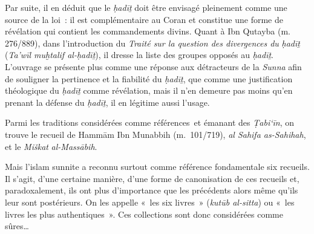 Par suite, il en déduit que le \emph{ḥadīṯ} doit être envisagé
pleinement comme une source de la loi~: il est complémentaire au Coran
et constitue une forme de révélation qui contient les commandements
divins. Quant à Ibn Qutayba (m. 276/889), dans l'introduction du
\emph{Traité sur la question des divergences du} \emph{ḥadīṯ}
(\emph{Ta'wīl muḫtalif al-ḥadīṯ}), il dresse la liste des groupes opposés au \emph{ḥadīṯ}.
L'ouvrage se présente plus comme une réponse aux détracteurs de la
\emph{Sunna} afin de souligner la pertinence et la fiabilité du
\emph{ḥadīṯ}, que comme une justification théologique du \emph{ḥadīṯ}
comme révélation, mais il n'en demeure pas moins qu'en prenant la
défense du \emph{ḥadīṯ}, il en légitime aussi l'usage.


Parmi les traditions considérées comme références~et émanant des
\emph{Ṭabi`īn}, on trouve le recueil de Hammām Ibn Munabbih
(m.~101/719),
\emph{al Sahifa as-Sahihah}, et le \emph{Miškat} \emph{al-Massābih}.

Mais l'islam sunnite a reconnu surtout comme référence fondamentale six
recueils. Il s'agit, d'une certaine manière, d'une forme de canonisation
de ces recueils et, paradoxalement, ils ont plus d'importance que les
précédents alors même qu'ils leur sont postérieurs. On les appelle «~les
six livres~» (\emph{kutūb al-sitta}) ou «~les livres les plus
authentiques~». Ces collections sont donc considérées comme
sûres\ldots{}

